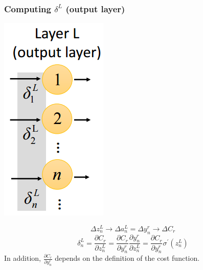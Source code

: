 \documentclass{article}
\begin{document}
\subsubsection{Computing $\delta^L$ (output layer)} 
\begin{center}
\includegraphics[scale=0.5]{grad_last}
\end{center}
\[
\Delta z^L_n\rightarrow \Delta a^L_n = \Delta y^r_n \rightarrow \Delta C_r 
\]
\[
\delta^L_n = \frac{\partial C_r}{\partial z^L_n} = \frac{\partial C_r}{\partial y^r_n}\frac{\partial y^r_n}{\partial z^L_n} = \frac{\partial C_r}{\partial y^r_n}\sigma^\prime(z^L_n)
\]
In addition, $\frac{\partial C_r}{\partial y^r_n}$ depends on the definition of the cost function.
\end{document}
